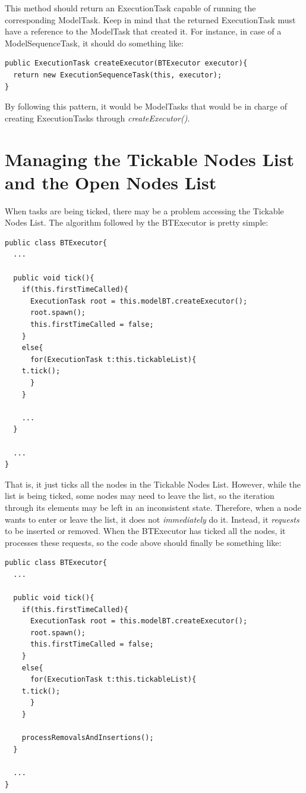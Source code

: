 \documentclass[a4paper,10pt]{article}
\begin{document}
This method should return an ExecutionTask capable of running the corresponding ModelTask. Keep in mind that the returned ExecutionTask must have a reference to the ModelTask that created it. For instance, in case of a ModelSequenceTask, it should do something like:

\begin{verbatim}
public ExecutionTask createExecutor(BTExecutor executor){
  return new ExecutionSequenceTask(this, executor);
}
\end{verbatim}

By following this pattern, it would be ModelTasks that would be in charge of creating ExecutionTasks through \textit{createExecutor()}.


\section{Managing the Tickable Nodes List and the Open Nodes List}\label{Sub:ManagingLists}

When tasks are being ticked, there may be a problem accessing the Tickable Nodes List. The algorithm followed by the BTExecutor is pretty simple:

\begin{verbatim}
public class BTExecutor{
  ...

  public void tick(){
    if(this.firstTimeCalled){
      ExecutionTask root = this.modelBT.createExecutor();
      root.spawn();
      this.firstTimeCalled = false;
    }
    else{
      for(ExecutionTask t:this.tickableList){
	t.tick();
      }
    }

    ...
  }

  ...
}
\end{verbatim}

That is, it just ticks all the nodes in the Tickable Nodes List. However, while the list is being ticked, some nodes may need to leave the list, so the iteration through its elements may be left in an inconsistent state. Therefore, when a node wants to enter or leave the list, it does not \textit{immediately} do it. Instead, it \textit{requests} to be inserted or removed. When the BTExecutor has ticked all the nodes, it processes these requests, so the code above should finally be something like:

\begin{verbatim}
public class BTExecutor{
  ...
 
  public void tick(){
    if(this.firstTimeCalled){
      ExecutionTask root = this.modelBT.createExecutor();
      root.spawn();
      this.firstTimeCalled = false;
    }
    else{
      for(ExecutionTask t:this.tickableList){
	t.tick();
      }
    }
    
    processRemovalsAndInsertions();
  }
  
  ...
}
\end{verbatim}
\end{document}
